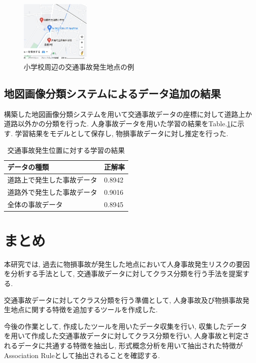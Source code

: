 \documentclass[a4j,8.5pt, twocolumn,fleqn]{jbook}
\begin{document}
\begin{figure}[htb]
    \centering
    \includegraphics[height=30mm]{images/shougakkou_gmap.png}
    \vspace{-3mm}
    \caption{小学校周辺の交通事故発生地点の例}
    \label{shougakkou_gmap}
\end{figure}

\subsection{地図画像分類システムによるデータ追加の結果}
構築した地図画像分類システムを用いて交通事故データの座標に対して道路上か道路以外かの分類を行った. 
人身事故データを用いた学習の結果をTable.\ref{table_road}に示す. 
学習結果をモデルとして保存し, 物損事故データに対し推定を行った. 


\begin{table}[htb]
    \centering
    \caption{交通事故発生位置に対する学習の結果}
    \label{table_road}
    \begin{tabular}{|l|l|}
        \hline
        \textbf{データの種類} & \textbf{正解率} \\ \hline
        道路上で発生した事故データ   & 0.8942       \\ \hline
        道路外で発生した事故データ   & 0.9016       \\ \hline
        全体の事故データ        & 0.8945       \\ \hline
    \end{tabular}
\end{table}

\section{まとめ}
本研究では, 過去に物損事故が発生した地点において人身事故発生リスクの要因を分析する手法として, 交通事故データに対してクラス分類を行う手法を提案する. 

交通事故データに対してクラス分類を行う準備として, 人身事故及び物損事故発生地点に関する特徴を追加するツールを作成した. 

今後の作業として, 作成したツールを用いたデータ収集を行い, 収集したデータを用いて作成した交通事故データに対してクラス分類を行い, 人身事故と判定されるデータに共通する特徴を抽出し, 形式概念分析を用いて抽出された特徴がAssociation Ruleとして抽出されることを確認する. 
\end{document}
